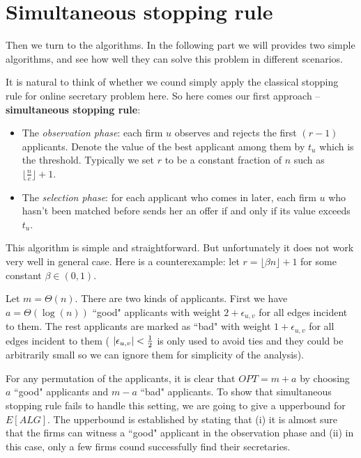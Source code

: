 \section{Simultaneous stopping rule}

Then we turn to the algorithms. In the following part we will provides
two simple algorithms, and see how well they can solve this problem in
different scenarios.

It is natural to think of whether we cound simply apply the classical
stopping rule for online secretary problem here.
So here comes our first approach -- \textbf{simultaneous stopping rule}:

\begin{itemize}
    \item 
        The \emph{observation phase}:
        each firm $u$ observes and rejects the first $(r - 1)$ applicants.
        Denote the value of the best applicant among them by $t_u$ which
        is the threshold. 
        Typically we set $r$ to be a constant fraction of $n$
        such as $\lfloor \frac{n}{e} \rfloor + 1$.

    \item 
        The \emph{selection phase}:
        for each applicant who comes in later, 
        each firm $u$ who hasn't been matched before sends her an 
        offer if and only if its value exceeds $t_u$.
\end{itemize}

This algorithm is simple and straightforward. But unfortunately
it does not work very well in general case.
Here is a counterexample:
let $r = \lfloor \beta n \rfloor + 1$ for some constant $\beta \in (0, 1)$.

\begin{example}\label{example1}
    Let $m = \Theta(n)$. There are two kinds of applicants.
    First we have $a = \Theta(\log(n))$ ``good" applicants with 
    weight $2 + \epsilon_{u,v}$
    for all edges incident to them.
    The rest applicants are marked as ``bad" with 
    weight $1 + \epsilon_{u,v}$
    for all edges incident to them
    ( $\left\vert\epsilon_{u,v}\right\vert < \frac{1}{2}$ is only used to avoid ties
    and they could be arbitrarily small so we can ignore them for
    simplicity of the analysis).
\end{example}

For any permutation of the applicants, it is clear that $OPT = m + a$ by
choosing $a$ ``good" applicants and $m - a$ ``bad" applicants.
To show that simultaneous stopping rule fails to handle this setting,
we are going to give a upperbound for $E[ALG]$.
The upperbound is established by stating that (i) it is almost sure
that the firms can witness a ``good" applicant in the observation phase and
(ii) in this case, only a few firms cound successfully find their
secretaries.

